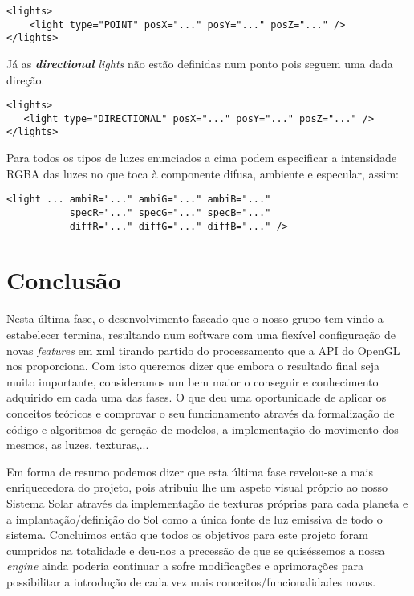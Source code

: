 \documentclass[11pt,a4paper]{report}
\begin{document}
\begin{lstlisting}[style = xml]
<lights>
    <light type="POINT" posX="..." posY="..." posZ="..." />
</lights>
\end{lstlisting}
Já as \textbf{\emph{directional}} \emph{lights} não estão definidas num ponto pois seguem uma dada direção.
\begin{lstlisting}[style = xml]
<lights>
   <light type="DIRECTIONAL" posX="..." posY="..." posZ="..." />
</lights>
\end{lstlisting}
Para todos os tipos de luzes enunciados a cima podem especificar a intensidade RGBA das luzes no que toca à componente difusa, ambiente e especular, assim:
\begin{lstlisting}[style = xml]
<light ... ambiR="..." ambiG="..." ambiB="..."
           specR="..." specG="..." specB="..."
           diffR="..." diffG="..." diffB="..." />
\end{lstlisting}

\chapter{Conclusão}

Nesta última fase, o desenvolvimento faseado que o nosso grupo tem vindo a estabelecer termina, resultando num software com uma flexível configuração de novas \emph{features} em xml tirando partido do processamento que a API do OpenGL nos proporciona. Com isto queremos dizer que embora o resultado final seja muito importante, consideramos um bem maior o conseguir e conhecimento adquirido em cada uma das fases. O que deu uma oportunidade de aplicar os conceitos teóricos e comprovar o seu funcionamento através da formalização de código e algoritmos de geração de modelos, a implementação do movimento dos mesmos, as luzes, texturas,...

Em forma de resumo podemos dizer que esta última fase revelou-se a mais enriquecedora do projeto, pois atribuiu lhe um aspeto visual próprio ao nosso Sistema Solar através da implementação de texturas próprias para cada planeta e a implantação/definição do Sol como a única fonte de luz emissiva de todo o sistema. Concluimos então que todos os objetivos para este projeto foram cumpridos na totalidade e deu-nos a precessão de que se quiséssemos a nossa \emph{engine} ainda poderia continuar a sofre modificações e aprimorações para possibilitar a introdução de cada vez mais conceitos/funcionalidades  novas.
\end{document}
